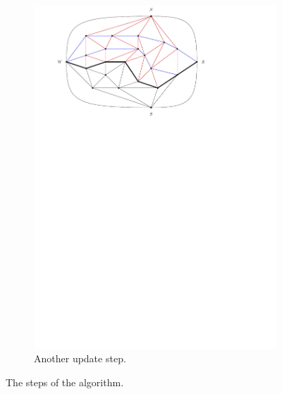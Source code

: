 \begin{figure}
\begin{subfigure}[b]{.9 \textwidth}
      \includegraphics[width=\textwidth]{examples/img/smallExample/smallExample-4}
      \caption{Another update step.}
      \label{fig:ex:simple:4}
    \end{subfigure}
    \caption{The steps of the algorithm.}
\end{figure}

